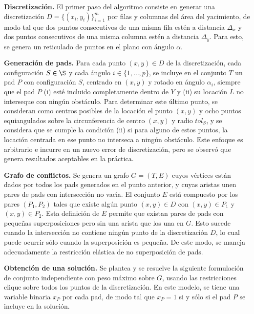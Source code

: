 \noindent\textbf{Discretizaci\'on.} El primer paso del algoritmo consiste en generar una discretizaci\'on $D=\{(x_i,y_i)\}_{i=1}^m$ por filas y columnas del \'area del yacimiento, de modo tal que dos puntos consecutivos de una misma fila est\'en a distancia $\Delta_x$ y dos puntos consecutivos de una misma columna est\'en a distancia $\Delta_y$. Para esto, se genera un reticulado de puntos en el plano con \'angulo $\alpha$.


\noindent\textbf{Generaci\'on de pads.} Para cada punto $(x,y)\in D$ de la discretizaci\'on, cada configuraci\'on $S\in\S$ y cada \'angulo $i\in\{1,\dots,p\}$, se incluye en el conjunto $T$ un pad $P$ con configuraci\'on $S$, centrado en $(x,y)$ y rotado en \'angulo $\alpha_i$, siempre que el pad $P$ (i) est\'e incluido completamente dentro de $Y$ y (ii) su locaci\'on $L$ no interseque con ning\'un obst\'aculo. Para determinar este \'ultimo punto, se consideran como centros posibles de la locaci\'on el punto $(x,y)$ y ocho puntos equiangulados sobre la circunferencia de centro $(x,y)$ y radio $tol_S$, y se considera que se cumple la condici\'on (ii) si para alguno de estos puntos, la locaci\'on centrada en ese punto no interseca a ning\'un obst\'aculo. Este enfoque es arbitrario e incurre en un nuevo error de discretizaci\'on, pero se observ\'o que genera resultados aceptables en la pr\'actica.


\noindent\textbf{Grafo de conflictos.} Se genera un grafo $G=(T,E)$ cuyos v\'ertices est\'an dados por todos los pads generados en el punto anterior, y cuyas aristas unen pares de pads con intersecci\'on no vac\'\i a. El conjunto $E$ est\'a compuesto por los pares $(P_1,P_2)$ tales que existe alg\'un punto $(x,y)\in D$ con $(x,y)\in P_1$ y $(x,y)\in P_2$. Esta definici\'on de $E$ permite que existan pares de pads con peque\~nas superposiciones pero sin una arista que los una en $G$. Esto sucede cuando la intersecci\'on no contiene ning\'un punto de la discretizaci\'on $D$, lo cual puede ocurrir s\'olo cuando la superposici\'on es peque\~na. De este modo, se maneja adecuadamente la restricci\'on el\'astica de no superposici\'on de pads.

\newpage

\noindent\textbf{Obtenci\'on de una soluci\'on.} Se plantea y se resuelve la siguiente formulaci\'on de conjunto independiente con peso m\'aximo sobre $G$, usando las restricciones clique sobre todos los puntos de la discretizaci\'on. En este modelo, se tiene una variable binaria $x_P$ por cada pad, de modo tal que $x_P=1$ si y s\'olo si el pad $P$ se incluye en la soluci\'on.


